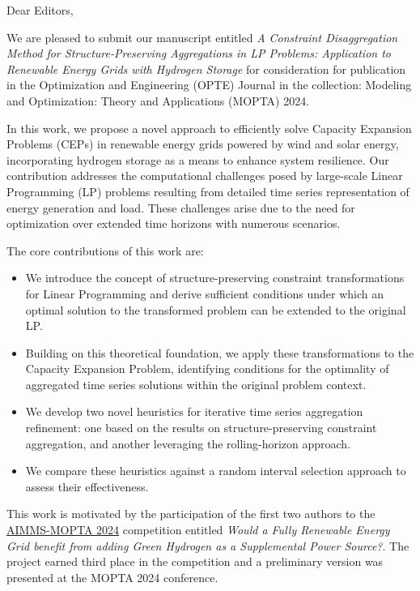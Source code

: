 \documentclass{letter}
\begin{document}
\begin{letter}{}
%
\opening{Dear Editors,}
\bigskip

We are pleased to submit our manuscript entitled \emph{A Constraint Disaggregation Method for Structure-Preserving Aggregations in LP Problems: Application to Renewable Energy Grids with Hydrogen Storage} for consideration for publication in the Optimization and Engineering (OPTE) Journal in the collection: Modeling and Optimization: Theory and Applications (MOPTA) 2024.

In this work, we propose a novel approach to efficiently solve Capacity Expansion Problems (CEPs) in renewable energy grids powered by wind and solar energy, incorporating hydrogen storage as a means to enhance system resilience. Our contribution addresses the computational challenges posed by large-scale Linear Programming (LP) problems resulting from detailed time series representation of energy generation and load. These challenges arise due to the need for optimization over extended time horizons with numerous scenarios.

The core contributions of this work are:

\begin{itemize}

\item We introduce the concept of structure-preserving constraint transformations for Linear Programming and derive sufficient conditions under which an optimal solution to the transformed problem can be extended to the original LP.

\item Building on this theoretical foundation, we apply these transformations to the Capacity Expansion Problem, identifying conditions for the optimality of aggregated time series solutions within the original problem context.

\item We develop two novel heuristics for iterative time series aggregation refinement: one based on the results on structure-preserving constraint aggregation, and another leveraging the rolling-horizon approach.

\item We compare these heuristics against a random interval selection approach to assess their effectiveness.
\end{itemize}

This work is motivated by the participation of the first two authors to the \href{https://coral.ise.lehigh.edu/~mopta/competition}{AIMMS-MOPTA 2024} competition entitled {\it Would a Fully Renewable Energy Grid benefit from adding Green Hydrogen as a Supplemental Power Source?}. The project earned third place in the competition and a preliminary version was presented at the MOPTA 2024 conference.


\end{letter}
\end{document}
